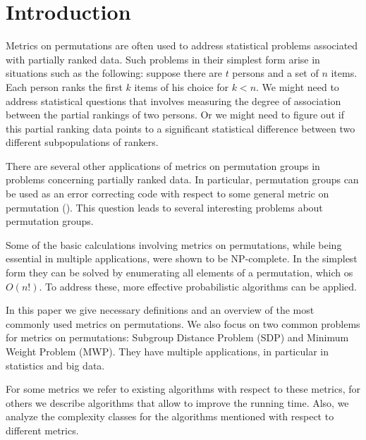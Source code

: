 \documentclass[12pt]{report}
\begin{document}
\renewcommand{\bibname}{Contents}
\setcounter{tocdepth}{1}

\setcounter{page}{2}

\large

\thispagestyle{empty}
\tableofcontents
\thispagestyle{empty}


\chapter*{Introduction}

\indent \par Metrics on permutations are often used to address statistical problems associated with partially ranked data. Such problems in their simplest form arise in situations such as the following: suppose there are $t$ persons and a set of $n$ items. Each person ranks the first $k$ items of his choice for $k < n$. We might need to address statistical questions that involves measuring the degree of association between the partial rankings of two persons. Or we might need to figure out if this partial ranking data points to a significant statistical difference between two different subpopulations of rankers.

There are several other applications of metrics on permutation groups in problems concerning partially ranked data. In particular, permutation groups can be used as an error correcting code with respect to some general metric on permutation (\cite{Schiavinotto}). This question leads to several interesting problems about permutation groups.

Some of the basic calculations involving metrics on permutations, while being essential in multiple applications, were shown to be NP-complete. In the simplest form they can be solved by enumerating all elements of a permutation, which os $O(n!)$. To address these, more effective probabilistic algorithms can be applied.

In this paper we give necessary definitions and an overview of the most commonly used metrics on permutations. We also focus on two common problems for metrics on permutations: Subgroup Distance Problem (SDP) and Minimum Weight Problem (MWP). They have multiple applications, in particular in statistics and big data.

For some metrics we refer to existing algorithms with respect to these metrics, for others we describe algorithms that allow to improve the running time.  Also, we analyze the complexity classes for the algorithms mentioned with respect to different metrics.
\end{document}
